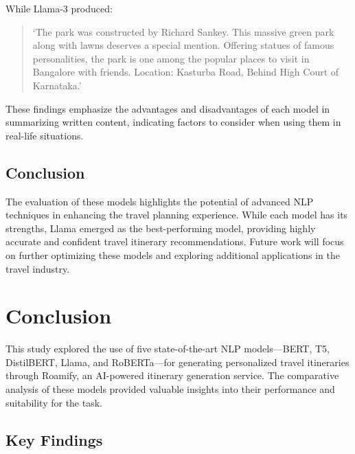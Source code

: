 \documentclass[conference]{IEEEtran}
\begin{document}
        While Llama-3 produced:
        \begin{quote}
        ‘The park was constructed by Richard Sankey. This massive green park along with lawns deserves a special mention. Offering statues of famous personalities, the park is one among the popular places to visit in Bangalore with friends. Location: Kasturba Road, Behind High Court of Karnataka.’
        \end{quote}

    These findings emphasize the advantages and disadvantages of each model in summarizing written content, indicating factors to consider when using them in real-life situations.

    \subsection{Conclusion}

        The evaluation of these models highlights the potential of advanced NLP techniques in enhancing the travel planning experience. While each model has its strengths, Llama emerged as the best-performing model, providing highly accurate and confident travel itinerary recommendations. Future work will focus on further optimizing these models and exploring additional applications in the travel industry.


\section{Conclusion}

    This study explored the use of five state-of-the-art NLP models—BERT, T5, DistilBERT, Llama, and RoBERTa—for generating personalized travel itineraries through Roamify, an AI-powered itinerary generation service. The comparative analysis of these models provided valuable insights into their performance and suitability for the task.

    \subsection{Key Findings}
\end{document}
